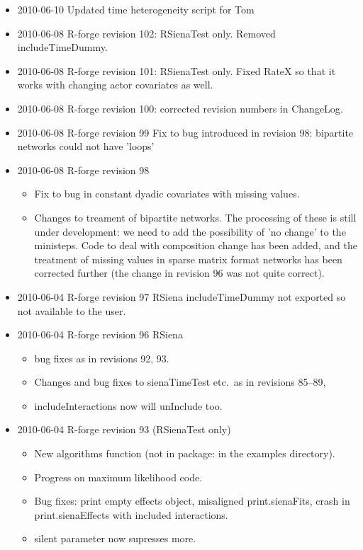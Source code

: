 \documentclass[a4paper,fleqn,11pt]{article}
\newcommand{\+}{\, + \,}
\newcommand{\sfn}[1]{\textsf{#1}}
\begin{document}
{\begin{small}
\begin{itemize}
\item 2010-06-10 Updated time heterogeneity script for Tom
\item 2010-06-08 R-forge revision 102: RSienaTest only. Removed
includeTimeDummy.
\item 2010-06-08 R-forge revision 101: RSienaTest only. Fixed RateX so that it
  works with changing actor covariates as well.
\item 2010-06-08 R-forge revision 100: corrected revision numbers in \sfn{ChangeLog}.
\item 2010-06-08 R-forge revision 99
Fix to bug introduced in revision 98: bipartite networks could not have 'loops'
\item 2010-06-08 R-forge revision 98
\begin{itemize}
\item Fix to bug in constant dyadic covariates with missing values.
\item Changes to treament of bipartite networks. The processing of these is
  still under development: we need to add the possibility of 'no change' to the
  ministeps. Code to deal with composition change has been added, and the
  treatment of missing values in sparse matrix format networks has been
  corrected further (the change in revision 96 was not quite correct).
\end{itemize}
\item 2010-06-04 R-forge revision 97 RSiena includeTimeDummy not exported so not
  available to the user.
\item 2010-06-04 R-forge revision 96 RSiena
\begin{itemize}
\item bug fixes as in revisions 92, 93.
\item Changes and bug fixes to sienaTimeTest etc.\ as in revisions 85--89,
\item \sfn{includeInteractions} now will unInclude too.
\end{itemize}
\item 2010-06-04 R-forge revision 93 (RSienaTest only)
\begin{itemize}\item New algorithms function
  (not in package: in the examples directory).
\item Progress on maximum likelihood code.
\item Bug fixes: print empty effects object, misaligned print.sienaFits, crash
  in print.sienaEffects with included interactions.
\item silent parameter now supresses more.

\end{itemize}
\end{itemize}
\end{small}}
\end{document}
